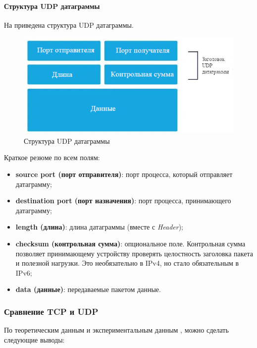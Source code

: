 \paragraph{Структура UDP датаграммы}
На  приведена структура UDP датаграммы.
\begin{figure}[h]
	\centering
	\includegraphics[width=0.8\linewidth]{images/udp}
	\caption{Структура UDP датаграммы}
	\label{fig:udp}
\end{figure}
Краткое резюме по всем полям:
\begin{itemize}
	\item \textbf{source port (порт отправителя)}: порт процесса, который отправляет датаграмму;
	\item \textbf{destination port (порт назначения)}: порт процесса, принимающего датаграмму;
	\item \textbf{length (длина)}: длина датаграммы (вместе с \textit{Header});
	\item \textbf{checksum (контрольная сумма)}: опциональное поле. Контрольная сумма позволяет принимающему устройству проверять целостность заголовка пакета и полезной нагрузки. Это необязательно в IPv4, но стало обязательным в IPv6;
	\item \textbf{data (данные)}: передаваемые пакетом данные.
\end{itemize}
\subsubsection{Сравнение TCP и UDP}
По теоретическим данным \cite{kumar_survey_2012, noergaard_chapter_2010} и экспериментальным данным \cite{hussein_wheeb_performance_2015}, можно сделать следующие выводы: 

